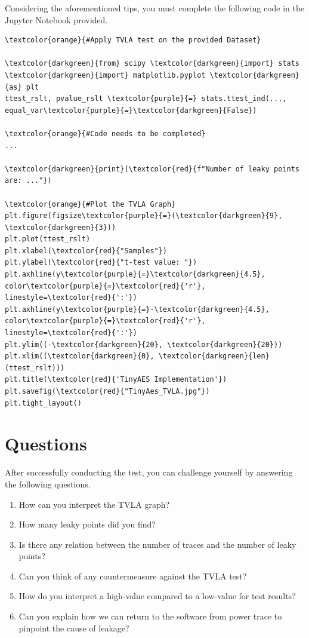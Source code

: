 \documentclass[11pt]{article}
\begin{document}
\noindent Considering the aforementioned tips, you must complete the following code in the Jupyter Notebook provided. 
\begin{small} 
\begin{tcolorbox}
\begin{Verbatim}[commandchars=\\\{\}]
\textcolor{orange}{#Apply TVLA test on the provided Dataset}

\textcolor{darkgreen}{from} scipy \textcolor{darkgreen}{import} stats
\textcolor{darkgreen}{import} matplotlib.pyplot \textcolor{darkgreen}{as} plt 
ttest_rslt, pvalue_rslt \textcolor{purple}{=} stats.ttest_ind(..., equal_var\textcolor{purple}{=}\textcolor{darkgreen}{False})
                          
\textcolor{orange}{#Code needs to be completed}
...

\textcolor{darkgreen}{print}(\textcolor{red}{f"Number of leaky points are: ..."})

\textcolor{orange}{#Plot the TVLA Graph}
plt.figure(figsize\textcolor{purple}{=}(\textcolor{darkgreen}{9}, \textcolor{darkgreen}{3}))
plt.plot(ttest_rslt)
plt.xlabel(\textcolor{red}{"Samples"})
plt.ylabel(\textcolor{red}{"t-test value: "})
plt.axhline(y\textcolor{purple}{=}\textcolor{darkgreen}{4.5}, color\textcolor{purple}{=}\textcolor{red}{'r'}, linestyle=\textcolor{red}{':'})
plt.axhline(y\textcolor{purple}{=}-\textcolor{darkgreen}{4.5}, color\textcolor{purple}{=}\textcolor{red}{'r'}, linestyle=\textcolor{red}{':'})
plt.ylim((-\textcolor{darkgreen}{20}, \textcolor{darkgreen}{20}))
plt.xlim((\textcolor{darkgreen}{0}, \textcolor{darkgreen}{len}(ttest_rslt)))
plt.title(\textcolor{red}{'TinyAES Implementation'})
plt.savefig(\textcolor{red}{"TinyAes_TVLA.jpg"})
plt.tight_layout()

\end{Verbatim}
\end{tcolorbox}
\end{small} 
\newpage

\section{Questions}
After successfully conducting the test, you can challenge yourself by answering the following questions. 

 \begin{enumerate}
        \item How can you interpret the TVLA graph?
        \item How many leaky points did you find? 
        \item Is there any relation between the number of traces and the number of leaky points?
        \item Can you think of any countermeasure against the TVLA test?
        \item How do you interpret a high-value compared to a low-value for test results?
        \item Can you explain how we can return to the software from power trace to pinpoint the cause of leakage?
        
        
    \end{enumerate}
\end{document}
